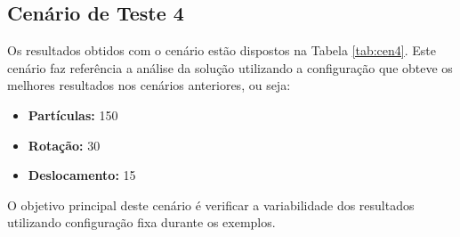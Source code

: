 \subsection{Cenário de Teste 4}

Os resultados obtidos com o cenário estão dispostos na Tabela \ref{tab:cen4}. Este cenário faz referência a análise da solução
utilizando a configuração que obteve os melhores resultados nos cenários anteriores, ou seja:

\begin{itemize}
  \item \textbf{Partículas:} 150
  \item \textbf{Rotação:} 30
  \item \textbf{Deslocamento:} 15
\end{itemize}

O objetivo principal deste cenário é verificar a variabilidade dos resultados utilizando configuração fixa durante os exemplos.

